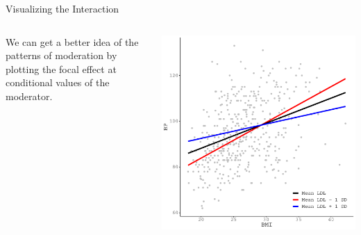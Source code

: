 \documentclass{beamer}\usepackage[]{graphicx}\usepackage[]{color}
\makeatletter
\def\maxwidth{ %
  \ifdim\Gin@nat@width>\linewidth
    \linewidth
  \else
    \Gin@nat@width
  \fi
}
\newenvironment{knitrout}{}{} %
\makeatother
\begin{document}
\begin{frame}{Visualizing the Interaction}

  \begin{columns}
    \begin{column}{0.5\textwidth}
      We can get a better idea of the patterns of moderation by plotting the 
      focal effect at conditional values of the moderator.
    \end{column}
    
    \begin{column}{0.5\textwidth}
      
\begin{knitrout}\footnotesize
{}\color{fgcolor}

{\centering \includegraphics[width=\maxwidth]{figure/unnamed-chunk-5-1} 

}



\end{knitrout}

\end{column}
\end{columns}

\end{frame}

\watermarkon %
\end{document}

